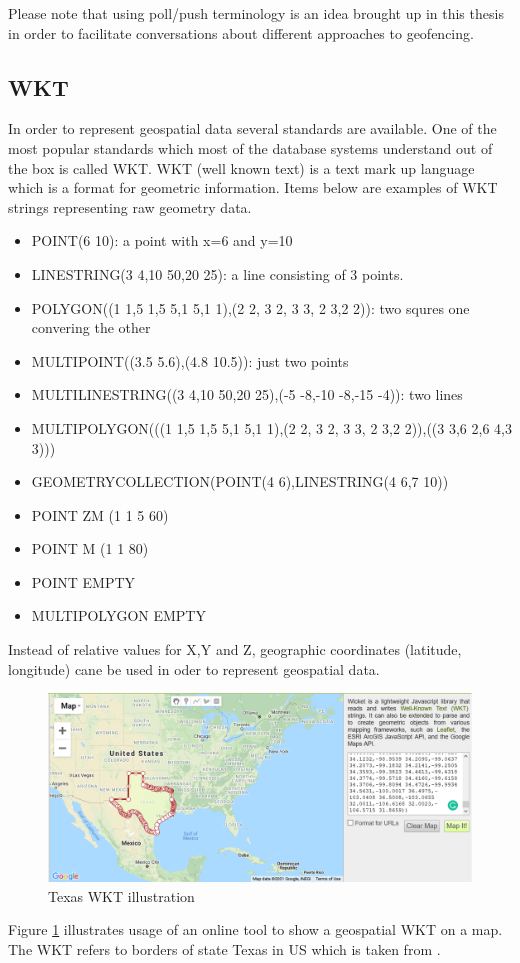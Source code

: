 \documentclass[a4]{report}
\begin{document}
    Please note that using poll/push terminology is an idea brought up in this thesis in order to facilitate
    conversations about different approaches to geofencing.

    \subsection{WKT \cite{WKT}}
    In order to represent geospatial data several standards are available.
    One of the most popular standards which most of the database systems understand out of the box is called WKT.
    WKT (well known text) is a text mark up language which is a format for geometric information.
    Items below are examples of WKT strings representing raw geometry data.
    \begin{itemize}
        \item POINT(6 10): a point with x=6 and y=10
        \item LINESTRING(3 4,10 50,20 25): a line consisting of 3 points.
        \item POLYGON((1 1,5 1,5 5,1 5,1 1),(2 2, 3 2, 3 3, 2 3,2 2)): two squres one convering the other
        \item MULTIPOINT((3.5 5.6),(4.8 10.5)): just two points
        \item MULTILINESTRING((3 4,10 50,20 25),(-5 -8,-10 -8,-15 -4)): two lines
        \item MULTIPOLYGON(((1 1,5 1,5 5,1 5,1 1),(2 2, 3 2, 3 3, 2 3,2 2)),((3 3,6 2,6 4,3 3)))
        \item GEOMETRYCOLLECTION(POINT(4 6),LINESTRING(4 6,7 10))
        \item POINT ZM (1 1 5 60)
        \item POINT M (1 1 80)
        \item POINT EMPTY
        \item MULTIPOLYGON EMPTY
    \end{itemize}

    Instead of relative values for X,Y and Z, geographic coordinates (latitude, longitude) cane be used in oder to
    represent geospatial data.

    \begin{figure}[ht]
        \caption{Texas WKT illustration}
        \label{fig:texas}
        \includegraphics[scale=0.4]{images/texas.png}
    \end{figure}
    Figure \ref{fig:texas} illustrates usage of an online tool \cite{WKTtool} to show a geospatial WKT on a map.
    The WKT refers to borders of state Texas in US which is taken from \cite{WKTs}.
\end{document}
